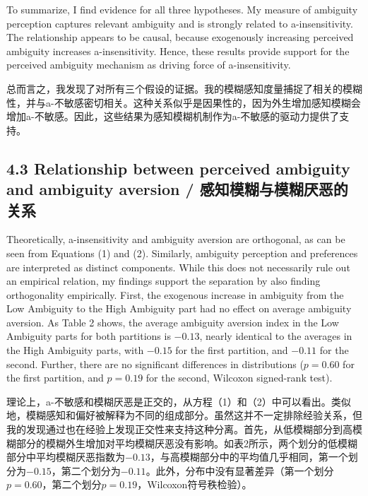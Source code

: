 \documentclass[12pt,a4paper]{article}
\newenvironment{original}
  {\par\medskip\noindent\color{black}\ignorespaces}
  {\par\medskip}
\newenvironment{translation}
  {\par\noindent\color{transblue}\ignorespaces}
  {\par\medskip\medskip}
\begin{document}
\begin{original}
To summarize, I find evidence for all three hypotheses. My measure of ambiguity perception captures relevant ambiguity and is strongly related to a-insensitivity. The relationship appears to be causal, because exogenously increasing perceived ambiguity increases a-insensitivity. Hence, these results provide support for the perceived ambiguity mechanism as driving force of a-insensitivity.
\end{original}

\begin{translation}
总而言之，我发现了对所有三个假设的证据。我的模糊感知度量捕捉了相关的模糊性，并与a-不敏感密切相关。这种关系似乎是因果性的，因为外生增加感知模糊会增加a-不敏感。因此，这些结果为感知模糊机制作为a-不敏感的驱动力提供了支持。
\end{translation}

\subsection{4.3 Relationship between perceived ambiguity and ambiguity aversion / 感知模糊与模糊厌恶的关系}

\begin{original}
Theoretically, a-insensitivity and ambiguity aversion are orthogonal, as can be seen from Equations (1) and (2). Similarly, ambiguity perception and preferences are interpreted as distinct components. While this does not necessarily rule out an empirical relation, my findings support the separation by also finding orthogonality empirically. First, the exogenous increase in ambiguity from the Low Ambiguity to the High Ambiguity part had no effect on average ambiguity aversion. As Table 2 shows, the average ambiguity aversion index in the Low Ambiguity parts for both partitions is $-0.13$, nearly identical to the averages in the High Ambiguity parts, with $-0.15$ for the first partition, and $-0.11$ for the second. Further, there are no significant differences in distributions ($p = 0.60$ for the first partition, and $p = 0.19$ for the second, Wilcoxon signed-rank test).
\end{original}

\begin{translation}
理论上，a-不敏感和模糊厌恶是正交的，从方程（1）和（2）中可以看出。类似地，模糊感知和偏好被解释为不同的组成部分。虽然这并不一定排除经验关系，但我的发现通过也在经验上发现正交性来支持这种分离。首先，从低模糊部分到高模糊部分的模糊外生增加对平均模糊厌恶没有影响。如表2所示，两个划分的低模糊部分中平均模糊厌恶指数为$-0.13$，与高模糊部分中的平均值几乎相同，第一个划分为$-0.15$，第二个划分为$-0.11$。此外，分布中没有显著差异（第一个划分$p = 0.60$，第二个划分$p = 0.19$，Wilcoxon符号秩检验）。
\end{translation}
\end{document}
